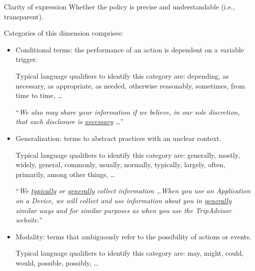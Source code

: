 \begin{description}
\begin{descriptionlist}
            \item[Clarity of expression] 
                Whether the policy is precise and understandable (i.e., transparent).

                Categories of this dimension comprises:
                \begin{itemize}
                    \item Conditional terms: the performance of an action is dependent on a variable trigger.
                    \begin{remark}
                        Typical language qualifiers to identify this category are: depending, as necessary, as appropriate, as needed, otherwise reasonably, sometimes, from time to time, \dots
                    \end{remark}
                    \begin{example}
                        ``\textit{We also may share your information if we believe, in our sole discretion, that such disclosure is \underline{necessary} \textnormal{\dots}}''
                    \end{example}
                    
                    \item Generalization: terms to abstract practices with an unclear context.
                    \begin{remark}
                        Typical language qualifiers to identify this category are: generally, mostly, widely, general, commonly, usually, normally, typically, largely, often, primarily, among other things, \dots
                    \end{remark}
                    \begin{example}
                        ``\textit{We \underline{typically} or \underline{generally} collect information \dots When you use an Application on a Device, we will collect and use information about you in \underline{generally} similar ways and for similar purposes as when you use the TripAdvisor website.}''
                    \end{example}

                    \item Modality: terms that ambiguously refer to the possibility of actions or events.
                    \begin{remark}
                        Typical language qualifiers to identify this category are: may, might, could, would, possible, possibly, \dots


\end{remark}
\end{itemize}
\end{descriptionlist}
\end{description}
